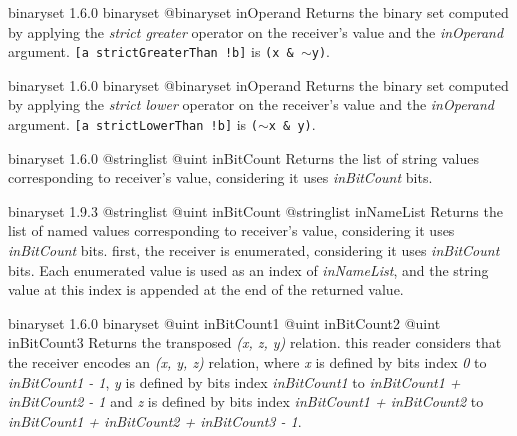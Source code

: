 {binaryset}
{1.6.0}
{binaryset}
{@binaryset inOperand}
{Returns the binary set computed by applying the \emph{strict greater} operator on the receiver's value and the \emph{inOperand} argument.}
{\texttt{[a strictGreaterThan !b]} is \texttt{(x \& $\sim$y)}.}







{binaryset}
{1.6.0}
{binaryset}
{@binaryset inOperand}
{Returns the binary set computed by applying the \emph{strict lower} operator on the receiver's value and the \emph{inOperand} argument.}
{\texttt{[a strictLowerThan !b]} is \texttt{($\sim$x \& y)}.}







{binaryset}
{1.6.0}
{@stringlist}
{@uint inBitCount}
{Returns the list of string values corresponding to receiver's value, considering it uses \emph{inBitCount} bits.}
{}







{binaryset}
{1.9.3}
{@stringlist}
{@uint inBitCount}
{@stringlist inNameList}
{Returns the list of named values corresponding to receiver's value, considering it uses \emph{inBitCount} bits.}
{first, the receiver is enumerated, considering it uses \emph{inBitCount} bits. Each enumerated value is used as an index of \emph{inNameList}, and the string value at this index is appended at the end of the returned value.}







{binaryset}
{1.6.0}
{binaryset}
{@uint inBitCount1}
{@uint inBitCount2}
{@uint inBitCount3}
{Returns the transposed \emph{(x, z, y)} relation.}
{this reader considers that the receiver encodes an \emph{(x, y, z)} relation, where \emph{x} is defined by bits index \emph{0} to \emph{inBitCount1  - 1}, \emph{y} is defined by bits index \emph{inBitCount1} to \emph{inBitCount1 + inBitCount2 - 1} and  \emph{z} is defined by bits index \emph{inBitCount1 + inBitCount2} to \emph{inBitCount1 + inBitCount2 + inBitCount3 - 1}.}







